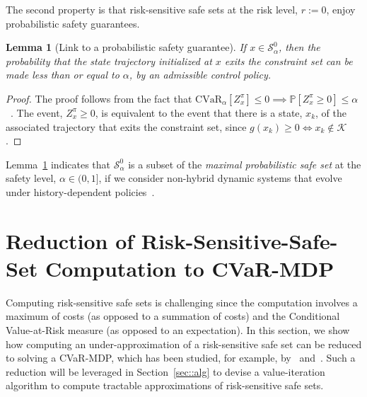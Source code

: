 \documentclass[letterpaper, 10 pt, conference]{ieeeconf}  %
\newtheorem{lemma}{Lemma}
\begin{document}
The second property is that risk-sensitive safe sets at the risk level, $r := 0$, enjoy probabilistic safety guarantees.
\begin{lemma}[Link to a probabilistic safety guarantee]\label{mylemma1}
If $x \in \mathcal{S}_\alpha^0$, then the probability that the state trajectory initialized at $x$ exits the constraint set can be made
less than or equal to $\alpha$, by an admissible control policy.
\end{lemma}
\begin{proof}
The proof follows from the fact that $\text{CVaR}_\alpha[Z_x^\pi] \leq 0 \implies \mathbb{P}[Z_x^\pi\geq 0] \leq \alpha$ 
~\cite[Sec. 6.2.4, pp. 257-258]{shapiro2009lectures}.
%
%
The event, $Z_x^\pi\geq 0$, is equivalent to the event that there is a state, $x_k$, of the associated trajectory
that exits the constraint set, since $g(x_k) \geq 0 \iff x_k \notin \mathcal{K}$.
%
%
\end{proof}
Lemma~\ref{mylemma1} indicates that $\mathcal{S}_\alpha^0$ is a subset of the \textit{maximal probabilistic safe set} 
at the safety level, $\alpha \in (0, 1]$, 
if we consider non-hybrid dynamic systems that evolve under history-dependent policies~\cite[Eqs. 9 and 11]{abate2008probabilistic}.
%
%
\section{Reduction of Risk-Sensitive-Safe-Set Computation to CVaR-MDP}\label{sec::reduction}
%
Computing risk-sensitive safe sets is challenging since the computation involves a maximum of costs (as opposed to a summation of costs)
and the Conditional Value-at-Risk measure (as opposed to an expectation). 
In this section, we show how computing an under-approximation of a risk-sensitive safe set can be reduced to solving a CVaR-MDP,
which has been studied, for example, by~\cite{chow2015risk} and~\cite{haskell2015convex}. 
Such a reduction will be leveraged in Section~\ref{sec::alg} to devise a value-iteration algorithm to compute tractable approximations of risk-sensitive safe sets.
\end{document}
